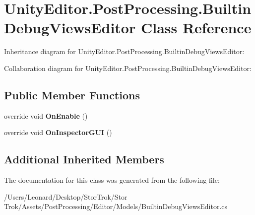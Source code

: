 \hypertarget{class_unity_editor_1_1_post_processing_1_1_builtin_debug_views_editor}{}\section{Unity\+Editor.\+Post\+Processing.\+Builtin\+Debug\+Views\+Editor Class Reference}
\label{class_unity_editor_1_1_post_processing_1_1_builtin_debug_views_editor}


Inheritance diagram for Unity\+Editor.\+Post\+Processing.\+Builtin\+Debug\+Views\+Editor\+:


Collaboration diagram for Unity\+Editor.\+Post\+Processing.\+Builtin\+Debug\+Views\+Editor\+:
\subsection*{Public Member Functions}
\begin{DoxyCompactItemize}
\item 
\mbox{\label{class_unity_editor_1_1_post_processing_1_1_builtin_debug_views_editor_a25ae9660ff2582094d46a5647ee1a5cf}} 
override void {\bfseries On\+Enable} ()
\item 
\mbox{\label{class_unity_editor_1_1_post_processing_1_1_builtin_debug_views_editor_a5707f6b766ba9c6ada9a266ecc69948b}} 
override void {\bfseries On\+Inspector\+G\+UI} ()
\end{DoxyCompactItemize}
\subsection*{Additional Inherited Members}


The documentation for this class was generated from the following file\+:\begin{DoxyCompactItemize}
\item 
/\+Users/\+Leonard/\+Desktop/\+Stor\+Trok/\+Stor Trok/\+Assets/\+Post\+Processing/\+Editor/\+Models/Builtin\+Debug\+Views\+Editor.\+cs\end{DoxyCompactItemize}
